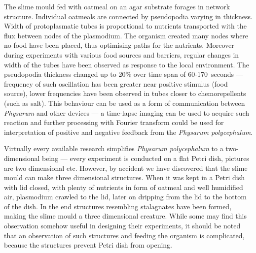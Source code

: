 The slime mould fed with oatmeal on an agar substrate forages in network structure. Individual oatmeals are connected by pseudopodia varying in thickness. Width of protoplasmatic tubes is proportional to nutrients transported with the flux between nodes of the plasmodium. The organism created many nodes where no food have been placed, thus optimising paths for the nutrients. Moreover during experiments with various food sources and barriers, regular changes in width of the tubes have been observed as response to the local environment. The pseudopodia thickness changed up to 20\% over time span of 60-170~seconds --- frequency of such oscillation has been greater near positive stimulus (food source), lower frequencies have been observed in tubes closer to chemorepellents (such as salt). This behaviour can be used as a form of communication between \textit{Physarum} and other devices --- a time-lapse imaging can be used to acquire such reaction and further processing with Fourier transform \cite{bracewell1965fourier} could be used for interpretation of positive and negative feedback from the \textit{Physarum polycephalum}.

Virtually every available research simplifies \textit{Physarum polycephalum} to a two-dimensional being --- every experiment is conducted on a flat Petri dish, pictures are two dimensional etc. However, by accident we have discovered that the slime mould can make three dimensional structures. When it was kept in a Petri dish with lid closed, with plenty of nutrients in form of oatmeal and well humidified air, plasmodium crawled to the lid, later on dripping from the lid to the bottom of the dish. In the end structures resembling stalagnates have been formed, making the slime mould a three dimensional creature. While some may find this observation somehow useful in designing their experiments, it should be noted that an observation of such structures and feeding the organism is complicated, because the structures prevent Petri dish from opening. 

